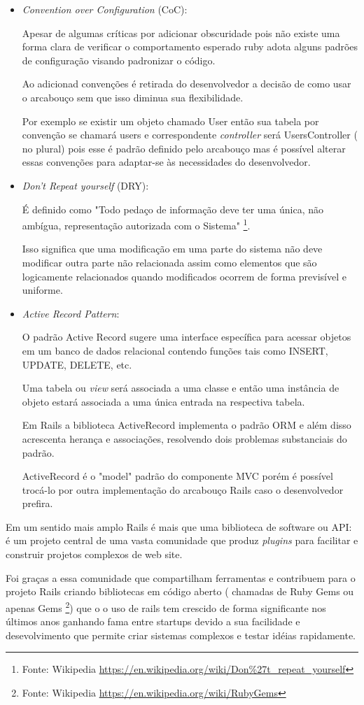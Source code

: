 \begin{itemize}
\item {\emph{Convention over Configuration} (CoC):}
    \par Apesar de algumas críticas por adicionar obscuridade pois não existe uma forma clara de verificar o comportamento esperado ruby adota alguns padrões de configuração visando padronizar o código.
    \par Ao adicionad convenções é retirada do desenvolvedor a decisão de como usar o arcabouço sem que isso diminua sua flexibilidade. 
    \par Por exemplo se existir um objeto chamado User então sua tabela por convenção se chamará users e correspondente \emph{controller} será UsersController ( no plural) pois esse é padrão definido pelo arcabouço mas é possível alterar essas convenções para adaptar-se às necessidades do desenvolvedor.

\item {\emph{Don't Repeat yourself} (DRY):}
    \par É definido como "Todo pedaço de informação deve ter uma única, não ambígua, representação autorizada com o Sistema" \footnote{Fonte: Wikipedia \url{https://en.wikipedia.org/wiki/Don\%27t_repeat_yourself}}.
    \par Isso significa que uma modificação em uma parte do sistema não deve modificar outra parte não relacionada assim como elementos que são logicamente relacionados quando modificados ocorrem de forma previsível e uniforme.

\item { \emph{Active Record Pattern}:}
    \par O padrão Active Record sugere uma interface específica para acessar objetos em um banco de dados relacional contendo funções tais como INSERT, UPDATE, DELETE, etc.
    \par Uma tabela ou \emph{view} será associada a uma classe e então uma instância de objeto estará associada a uma única entrada na respectiva tabela.
    \par Em Rails a biblioteca ActiveRecord implementa o padrão ORM e além disso acrescenta herança e associações, resolvendo dois problemas substanciais do padrão.
    \par ActiveRecord é o "model" padrão do componente MVC porém é possível trocá-lo por outra implementação do arcabouço Rails caso o desenvolvedor prefira.
\end{itemize}
    \par Em um sentido mais amplo Rails é mais que uma biblioteca de software ou API: é um projeto central de uma vasta comunidade que produz \emph{plugins} para facilitar e construir projetos complexos de web site. 
    \par Foi graças a essa comunidade que compartilham ferramentas e contribuem para o projeto Rails criando bibliotecas em código aberto ( chamadas de Ruby Gems ou apenas Gems \footnote{Fonte: Wikipedia \url{https://en.wikipedia.org/wiki/RubyGems}}) que o o uso de rails tem crescido de forma significante nos últimos anos ganhando fama entre startups devido a sua  facilidade e desevolvimento que permite criar sistemas complexos e testar idéias rapidamente.

